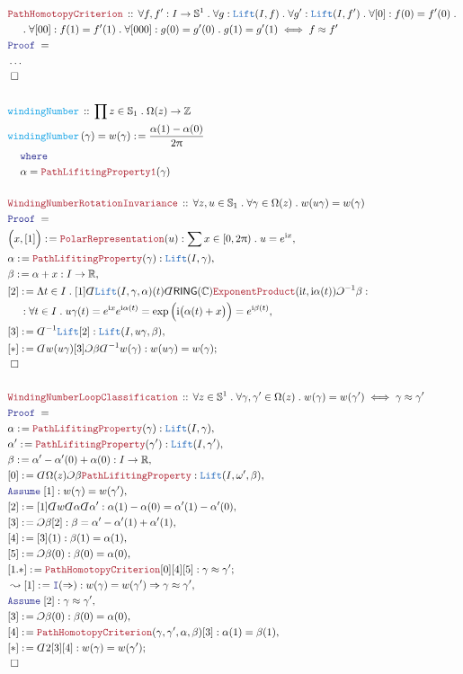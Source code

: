 \documentclass[12pt]{scrartcl}
\newcommand{\TYPE}[1]{\textcolor{NavyBlue}{\mathtt{#1}}}
\newcommand{\FUNC}[1]{\textcolor{Cerulean}{\mathtt{#1}}}
\newcommand{\LOGIC}[1]{\textcolor{Blue}{\mathtt{#1}}}
\newcommand{\THM}[1]{\textcolor{Maroon}{\mathtt{#1}}}
\renewcommand{\.}{\; . \;}
\newcommand{\de}{: \kern 0.1pc =}
\newcommand{\where}{\LOGIC{where}}
\newcommand{\Act}[1]{\left( #1 \right)}
\newcommand{\Theorem}[2]{& \THM{#1} \, :: \, #2 \\ & \Proof = \\ }
\newcommand{\DeclareFunc}[2]{& \FUNC{#1} \, :: \, #2 \\}
\newcommand{\DefineNamedFunc}[4]{&  \FUNC{#1}\Act{#2} = #3 \de #4 \\}
\newcommand{\NewLine}{\\ & \kern 1pc}
\newcommand{\Page}[1]{ \begin{align*} #1 \end{align*}   }
\newcommand{ \bd }{ \ByDef }
\newcommand{\NoProof}{ & \ldots \\ \EndProof}
\newcommand{\Imply}{\Rightarrow}
\newcommand{\Intro}{\LOGIC{I}}
\newcommand{\Int}{\mathbb{Z} }
\newcommand{\Reals}{\mathbb{R} }
\newcommand{\Complex}{\mathbb{C}}
\newcommand{\Sphere}{\mathbb{S}}
\newcommand{\Say}[3]{& #1 \de #2 : #3, \\}
\newcommand{\Conclude}[3]{& #1 \de #2 : #3; \\}
\newcommand{\Derive}[3]{& \leadsto #1 \de #2 : #3, \\}
\newcommand{\Assume}[2]{& \LOGIC{Assume} \; #1 : #2, \\}
\newcommand{\QED}{\; \square}
\newcommand{\EndProof}{& \QED \\}
\newcommand{\ByDef}{\rotatebox[origin=c]{-180}{$D$}}%
\newcommand{\ByConstr}{\rotatebox[origin=c]{-180}{$C$}}%
\newcommand{\Proof}{\LOGIC{Proof} \; }
\newcommand{\RING}{\mathsf{RING}} %
\begin{document}
\Page{
	\Theorem{PathHomotopyCriterion}
	{
		\forall f,f' : I \to \Sphere^1 \.
		\forall g : \TYPE{Lift}(I,f) \.
		\forall g' : \TYPE{Lift}(I,f') \.
		\forall [0] : f(0) = f'(0) \. \NewLine \. 
		\forall [00] : f(1) = f'(1) \. 
		\forall [000] : g(0) = g'(0) \.
		g(1) = g'(1) \iff f \approx f'
	}
	\NoProof
	\\
	\DeclareFunc{windingNumber}{\prod z \in \Sphere_1 \. \Omega(z) \to \Int}
	\DefineNamedFunc{windingNumber}{\gamma}{w(\gamma)}{ 
		\frac{\alpha(1) - \alpha(0)}{2\uppi} 
		\NewLine \where \NewLine
		\alpha = \THM{PathLifitingProperty1}(\gamma)
	}
	\\
	\Theorem{WindingNumberRotationInvariance}{
		\forall z,u \in \Sphere_1 \. 
		\forall \gamma \in \Omega(z) \.
		w(u\gamma) = w(\gamma)
	}
	\Say{\Big( x, [1] \Big)}{\THM{PolarRepresentation}(u)}
	{
		\sum x \in [0,2\uppi) \. u = e^{\mathrm{i}x}
	}
	\Say{\alpha}{\THM{PathLifitingProperty}(\gamma)}{\TYPE{Lift}(I,\gamma)}
	\Say{\beta}{ \alpha + x}{I \to \Reals}
	\Say{[2]}
	{
		\Lambda t \in I \. 
		[1]\bd \TYPE{Lift}(I,\gamma,\alpha)(t) 
		\bd \RING(\Complex)
		\THM{ExponentProduct}(\mathrm{i}t,\mathrm{i}\alpha(t)) 
		\ByConstr^{-1} \beta
	}
	{
		\NewLine : 
		\forall t \in I \.   u\gamma(t) =  
		e^{\mathrm{i}x} e^{\mathrm{i}\alpha(t)} = 
		\exp\Big(\mathrm{i}\big(\alpha(t) + x\big)\Big) = 
		e^{\mathrm{i}\beta(t)}
	}
	\Say{[3]}{\bd^{-1} \TYPE{Lift}[2]}
	{
		\TYPE{Lift}(I,u\gamma,\beta)
	}
	\Conclude{[*]}{\bd w(u\gamma)[3]\ByConstr \beta \bd^{-1} w(\gamma)}{w(u\gamma) = w(\gamma)}
	\EndProof
	\\
	\Theorem{WindingNumberLoopClassification}
	{
		\forall z \in \Sphere^1 \.
		\forall \gamma,\gamma' \in \Omega(z) \.
		w(\gamma) = w(\gamma') \iff 
		\gamma \approx \gamma'
	}
	\Say{\alpha}{\THM{PathLifitingProperty}(\gamma)}{\TYPE{Lift}(I,\gamma)}
	\Say{\alpha'}{\THM{PathLifitingProperty}(\gamma')}{\TYPE{Lift}(I,\gamma')}
	\Say{\beta}{\alpha' - \alpha'(0) + \alpha(0)}{I \to \Reals}
	\Say{[0]}{\bd \Omega(z) \ByConstr \beta \THM{PathLifitingProperty}}
	{
		\TYPE{Lift}(I,\omega',\beta)
	}
	\Assume{[1]}{w(\gamma) = w(\gamma')}
	\Say{[2]}{[1]\bd w \bd \alpha \bd \alpha'}{ \alpha(1) - \alpha(0) = \alpha'(1) - \alpha'(0)  }
	\Say{[3]}{\ByConstr \beta [2]}{\beta = \alpha' - \alpha'(1) + \alpha'(1) }
	\Say{[4]}{[3](1)}{\beta(1) = \alpha(1)}
	\Say{[5]}{\ByConstr \beta(0)}{\beta(0) = \alpha(0)}
	\Conclude{[1.*]}{\THM{PathHomotopyCriterion}[0][4][5]}{\gamma \approx \gamma'}
	\Derive{[1]}{\Intro(\Imply)}{ w(\gamma) = w(\gamma') \Imply \gamma \approx \gamma'  }
	\Assume{[2]}{\gamma \approx \gamma'}
	\Say{[3]}{\ByConstr \beta(0)}{\beta(0) = \alpha(0)}
	\Say{[4]}{\THM{PathHomotopyCriterion}(\gamma,\gamma',\alpha,\beta)[3]}
	{
		\alpha(1) = \beta(1)
	}
	\Conclude{[*]}{\bd 2 [3][4]}{w(\gamma) = w(\gamma')}
	\EndProof
}
\end{document}
